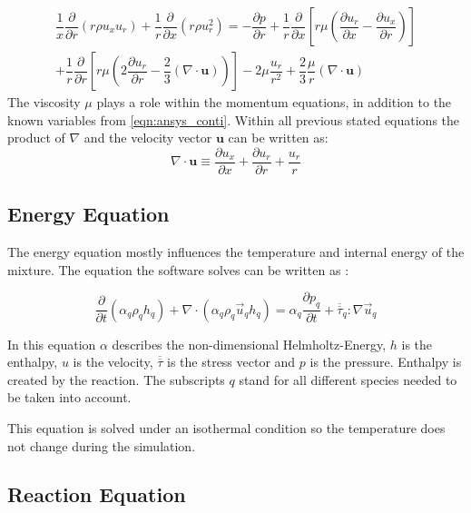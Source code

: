\documentclass[../thesis.tex]{subfiles}
\begin{document}
\begin{gather}
	\label{eqn: axi_mom}
	 \dfrac{1}{x} \dfrac{\partial}{\partial r}(r \rho u_x u_r)
	+ \dfrac{1}{r} \dfrac{\partial}{\partial x}(r \rho u_r^2) = 
	- \dfrac{\partial p}{\partial r} + \dfrac{1}{r} \dfrac{\partial }{\partial x} \left[ 
	r \mu \left( \dfrac{\partial u_r}{\partial x} - \dfrac{\partial u_x}{\partial r} \right)
	\right] \\ \nonumber
	+ \dfrac{1}{r} \dfrac{\partial }{\partial r} \left[ 
	r \mu \left( 2 \dfrac{\partial u_r}{\partial r} - \dfrac{2}{3}(\nabla \cdot \mathbf{u}) \right)
	\right] -
	2 \mu \dfrac{u_r}{r^2}+ \dfrac{2}{3} \dfrac{\mu}{r}(\nabla \cdot \mathbf{u})
\end{gather}
The viscosity $\mu$ plays a role within the momentum equations, in addition to the known variables from \autoref{eqn:ansys_conti}. 
Within all previous stated equations the product of $\nabla$ and the velocity vector $\mathbf{u}$ can be written as:
\begin{equation}
\nabla \cdot \mathbf{u} \equiv \dfrac{\partial u_x}{\partial x} + \dfrac{\partial u_r}{\partial r}+ \dfrac{u_r}{r}
\end{equation}

\subsection{Energy Equation}

The energy equation mostly influences the temperature and internal energy of the mixture. The equation the software solves can be written as \cite{manual2009ansys}:

\begin{equation} 
\frac{\partial}{\partial t} (\alpha_q \rho_q h_q ) + \nabla \cdot (\alpha_q \rho_q \vec u_q h_q )   = \alpha_q \frac{\partial p_q}{\partial t} + \overline{\overline{\tau}}_q : \nabla \vec u_q
\end{equation}

In this equation $\alpha$ describes the non-dimensional Helmholtz-Energy, $h$ is the enthalpy, $u$ is the velocity, $\overline{\overline{\tau}}$ is the stress vector and $p$ is the pressure. Enthalpy is created by the reaction. The subscripts $q$ stand for all different species needed to be taken into account.

This equation is solved under an isothermal condition so the temperature does not change during the simulation. 

\subsection{Reaction Equation}
\label{sec: reaction_eqn}
\end{document}
